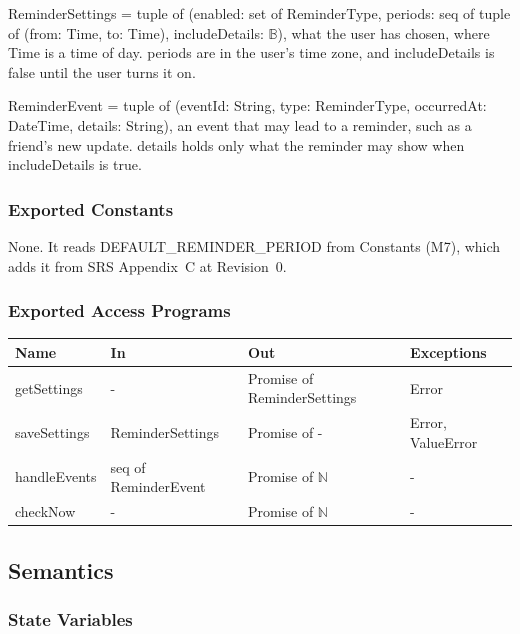 \documentclass[12pt, titlepage]{article}
\begin{document}
\medskip
\noindent ReminderSettings = tuple of (enabled: set of ReminderType, periods:
seq of tuple of (from: Time, to: Time), includeDetails: $\mathbb{B}$), what the
user has chosen, where Time is a time of day. periods are in the user's time zone, and includeDetails is
false until the user turns it on.

\medskip
\noindent ReminderEvent = tuple of (eventId: String, type: ReminderType,
occurredAt: DateTime, details: String), an event that may lead to a reminder,
such as a friend's new update. details holds only what the reminder may show
when includeDetails is true.

\subsubsection{Exported Constants}

None. It reads DEFAULT\_REMINDER\_PERIOD from Constants (M7), which adds it
from SRS Appendix~C at Revision~0.

\subsubsection{Exported Access Programs}

\begin{center}
\small
\setlength{\tabcolsep}{3pt}
\begin{tabular}{>{\raggedright\arraybackslash}p{3.9cm}
  >{\raggedright\arraybackslash}p{3.7cm}
  >{\raggedright\arraybackslash}p{3.4cm}
  >{\raggedright\arraybackslash}p{4.3cm}}
\toprule
\textbf{Name} & \textbf{In} & \textbf{Out} & \textbf{Exceptions} \\
\midrule
getSettings & - & Promise of ReminderSettings & Error \\
saveSettings & ReminderSettings & Promise of - & Error, ValueError \\
handleEvents & seq of ReminderEvent & Promise of $\mathbb{N}$ & - \\
checkNow & - & Promise of $\mathbb{N}$ & - \\
\bottomrule
\end{tabular}
\end{center}

\subsection{Semantics}

\subsubsection{State Variables}
\end{document}
